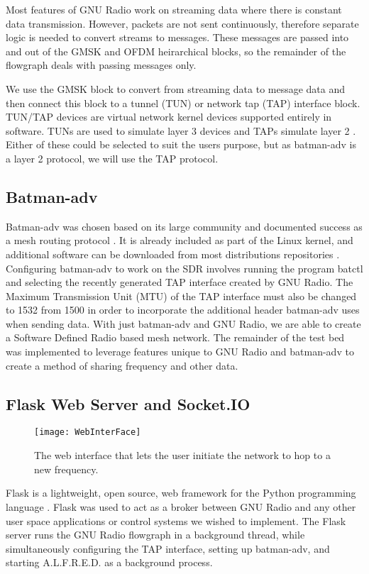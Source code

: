 Most features of GNU Radio work on streaming data where there is constant data transmission. However, packets are not sent continuously, therefore separate logic is needed to convert streams to messages. These messages are passed into and out of the GMSK and OFDM heirarchical blocks, so the remainder of the flowgraph deals with passing messages only. 

We use the GMSK block to convert from streaming data to message data and then connect this block to a tunnel (TUN) or network tap (TAP) interface block. TUN/TAP devices are virtual network kernel devices supported entirely in software. TUNs are used to simulate layer 3 devices and TAPs simulate layer 2 \cite{0017}. Either of these could be selected to suit the users purpose, but as batman-adv is a layer 2 protocol, we will use the TAP protocol.

\subsection{Batman-adv}

Batman-adv was chosen based on its large community and documented success as a mesh routing protocol \cite{5375690}. It is already included as part of the Linux kernel, and additional software can be downloaded from most distributions repositories \cite{0008}. Configuring batman-adv to work on the SDR involves running the program batctl and selecting the recently generated TAP interface created by GNU Radio. The Maximum Transmission Unit (MTU) of the TAP interface must also be changed to 1532 from 1500 in order to incorporate the additional header batman-adv uses when sending data. With just batman-adv and GNU Radio, we are able to create a Software Defined Radio based mesh network. The remainder of the test bed was implemented to leverage features unique to GNU Radio and batman-adv to create a method of sharing frequency and other data. 

\subsection{Flask Web Server and Socket.IO}

\begin{figure}
	\centering
	\texttt{[image: WebInterFace]}
	\caption{The web interface that lets the user initiate the network to hop to a new frequency.}
	\label{fig:WebInterface}
\end{figure}

Flask is a lightweight, open source, web framework for the Python programming language \cite{0011}. Flask was used to act as a broker between GNU Radio and any other user space applications or control systems we wished to implement. The Flask server runs the GNU Radio flowgraph in a background thread, while simultaneously configuring the TAP interface, setting up batman-adv, and starting A.L.F.R.E.D. as a background process. 

